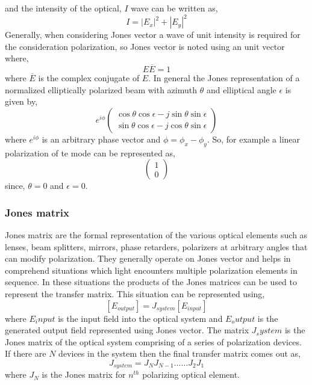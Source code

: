 \documentclass[../report.tex]{subfiles}
\begin{document}
and the intensity of the optical, $I$ wave can be written as,
\begin{equation}\label{eq:jones_vector_intensity}
I = \left| E_x\right| ^{2}+\left| E_y\right| ^{2} 
\end{equation}
Generally, when considering Jones vector a wave of unit intensity is required for the consideration polarization, so Jones vector is noted using an unit vector where,
\begin{equation}\label{eq:jones_unit_vector_form}
	E\overline {E} = 1
\end{equation}
where $\overline {E}$ is the complex conjugate of $E$. 
In general the Jones representation of a normalized elliptically polarized beam with azimuth $\theta$ and elliptical angle $\epsilon$ is given by,
\begin{equation}\label{eq:jones_vector_general_form}
e^{i\phi}\left(\begin{matrix} 
\cos\theta\cos\epsilon - j\sin\theta\sin\epsilon\\
\sin\theta\cos\epsilon - j\cos\theta\sin\epsilon 
\end{matrix} \right) 
\end{equation}
where $e^{i\phi}$ is an arbitrary phase vector and $\phi = \phi_x - \phi_y$. So, for example a linear polarization of \gls{te} mode can be represented as,
\begin{equation}\label{eq:jones_vector_linear_pol}
\left(\begin{matrix}  
1 \\
0
\end{matrix} \right) 
\end{equation}
since, $\theta=0$ and $\epsilon = 0$.
			
			\subsubsection{Jones matrix}
Jones matrix are the formal representation of the various optical elements such as lenses, beam splitters, mirrors, phase retarders, polarizers at arbitrary angles that can modify polarization. They generally operate on Jones vector and helps in comprehend situations which light encounters multiple polarization elements in sequence. In these situations the products of the Jones matrices can be used to represent the transfer matrix. This situation can be represented using,
\begin{equation}\label{eq:jones_matrix}
[E_{output}] = J_{system}[E_{input}] 
\end{equation}
where $E_input$ is the input field into the optical system and $E_output$ is the generated output field represented using Jones vector. The matrix $J_system$ is the Jones matrix of the optical system comprising of a series of polarization devices. If there are $N$ devices in the system then the final transfer matrix comes out as,
\begin{equation}\label{eq:jones_transfer_matrix}
J_{system} =J_{N}J_{N-1}\ldots \ldots J_{2}J_{1} 
\end{equation}   
where $J_{N}$ is the Jones matrix for $n^{th}$ polarizing optical element.
\end{document}
